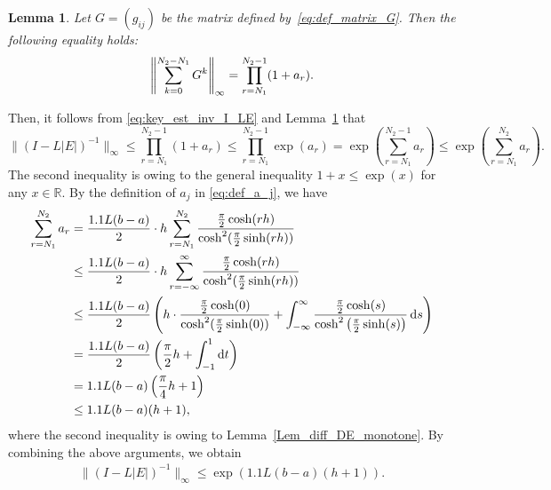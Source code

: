 \documentclass[pdflatex,sn-mathphys-num]{sn-jnl}%
\theoremstyle{thmstyleone}%
\theoremstyle{thmstyletwo}%
\newtheorem{lemma}{Lemma}%
\theoremstyle{thmstylethree}%
\begin{document}
\begin{lemma}
\label{thm:norm_series_of_G}
Let $G = (g_{ij})$ be the matrix defined by~\eqref{eq:def_matrix_G}. 
Then the following equality holds:
\begin{align}
\left\| 
\sum_{k=0}^{N_{2} - N_{1}} G^{k}
\right\|_{\infty}
=
\prod_{r = N_{1}}^{N_{2}-1} (1 + a_{r}).
\notag
\end{align}
\end{lemma}

\noindent
Then, 
it follows from \eqref{eq:key_est_inv_I_LE} and Lemma~\ref{thm:norm_series_of_G} that
\[
\| (I - L |E|)^{-1} \|_{\infty}
\leq 
\prod_{r = N_{1}}^{N_{2}-1} (1 + a_{r})
\leq 
\prod_{r = N_{1}}^{N_{2}-1} \exp(a_{r})
=
\exp \left(
\sum_{r = N_{1}}^{N_{2}-1} a_{r}
\right)
\leq 
\exp \left(
\sum_{r = N_{1}}^{N_{2}} a_{r}
\right). 
\]
The second inequality is owing to the general inequality $1+x \leq \exp(x)$ for any $x \in \mathbb{R}$. 
By the definition of $a_{j}$ in \eqref{eq:def_a_j}, 
we have
\begin{align}
\sum_{r = N_{1}}^{N_{2}} a_{r}
& =
\frac{1.1L(b-a)}{2} \cdot h
\sum_{r = N_{1}}^{N_{2}} \frac{ \frac{\pi}{2} \cosh(rh) }{ \cosh^{2}(\frac{\pi}{2} \sinh(rh)) }
\notag \\
& \leq
\frac{1.1L(b-a)}{2} \cdot h
\sum_{r = -\infty}^{\infty} \frac{ \frac{\pi}{2} \cosh(rh) }{ \cosh^{2}(\frac{\pi}{2} \sinh(rh)) }
\notag \\
& \leq
\frac{1.1L(b-a)}{2} 
\left(
h \cdot \frac{ \frac{\pi}{2} \cosh(0) }{ \cosh^{2}(\frac{\pi}{2} \sinh(0)) }
+ 
\int_{-\infty}^{\infty} \frac{\frac{\pi}{2}\cosh(s)}{\cosh^2\left(\frac{\pi}{2}\sinh(s)\right)}\,{\rm d}s
\right)
\nonumber \\
& = 
\frac{1.1L(b-a)}{2} \left( \frac{\pi}{2} h + \int_{-1}^1{\rm d}t \right) \nonumber \\
& = 
1.1L(b-a) \left( \frac{\pi}{4} h  + 1 \right)
\notag \\
& \leq
1.1L(b-a) ( h  + 1 ), 
\label{eq:bound_sum_a_j}
\end{align}
where the second inequality is owing to 
Lemma~\ref{Lem_diff_DE_monotone}. 
By combining the above arguments, we obtain
\begin{align}
\| (I - L |E|)^{-1} \|_{\infty}
\leq 
\exp \left(
1.1L(b-a) ( h  + 1 )
\right).
\label{eq:ImEinvNorm}
\end{align}
\end{document}
